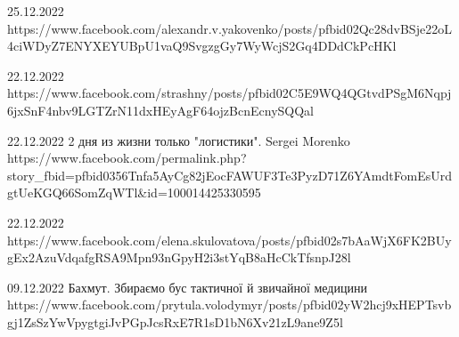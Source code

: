25.12.2022
https://www.facebook.com/alexandr.v.yakovenko/posts/pfbid02Qc28dvBSje22oL4ciWDyZ7ENYXEYUBpU1vaQ9SvgzgGy7WyWcjS2Gq4DDdCkPcHKl

22.12.2022
https://www.facebook.com/strashny/posts/pfbid02C5E9WQ4QGtvdPSgM6Nqpj6jxSnF4nbv9LGTZrN11dxHEyAgF64ojzBcnEcnySQQal

22.12.2022
2 дня из жизни только "логистики".
Sergei Morenko
https://www.facebook.com/permalink.php?story_fbid=pfbid0356Tnfa5AyCg82jEocFAWUF3Te3PyzD71Z6YAmdtFomEsUrdgtUeKGQ66SomZqWTl&id=100014425330595

22.12.2022
https://www.facebook.com/elena.skulovatova/posts/pfbid02s7bAaWjX6FK2BUygEx2AzuVdqafgRSA9Mpn93nGpyH2i3stYqB8aHcCkTfsnpJ28l

09.12.2022
Бахмут. Збираємо бус тактичної й звичайної медицини
https://www.facebook.com/prytula.volodymyr/posts/pfbid02yW2hcj9xHEPTsvbgj1ZsSzYwVpygtgiJvPGpJcsRxE7R1sD1bN6Xv21zL9ane9Z5l
